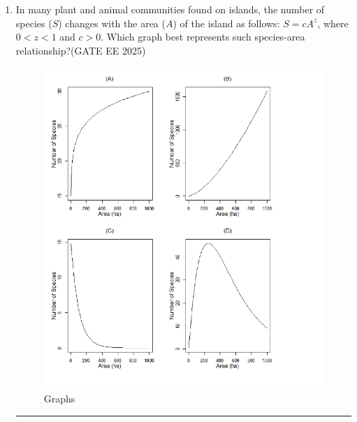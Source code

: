 \begin{enumerate}[leftmargin=*,label=\textbf{Q.\arabic*},resume]
\begin{multicols}{2}
\begin{enumerate}
\item i and ii
\item i and iv
\item ii and iii
\item iii and iv
\end{enumerate}
\end{multicols}

\item In many plant and animal communities found on islands, the number of species ($S$) changes with the area ($A$) of the island as follows: $S = c A^z$, where $0 < z < 1$ and $c>0$. Which graph best represents such species-area relationship?\hfill {(GATE EE 2025)}


\begin{figure}[H]
    \centering
    \includegraphics[width=0.9\columnwidth]{figs/imageQ36.png}
    \caption{Graphs}
    \label{fig:q36-graphs}
\end{figure}


\rule{7cm}{0.15mm}


\end{enumerate}
